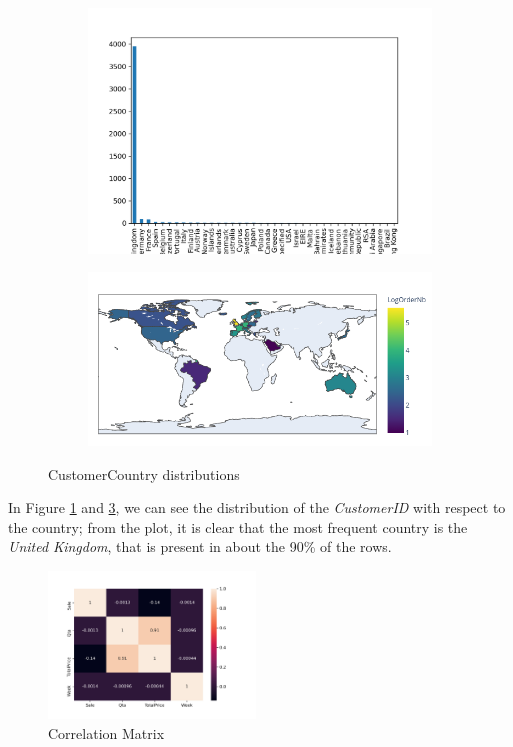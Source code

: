 \begin{figure}[!h]
\begin{subfigure}{.5\textwidth}
\centering
\includegraphics[width=.93\textwidth]{img/orders_country_bar.png}
\caption{}
\label{fig:orders_country_bar}
\end{subfigure}
\begin{subfigure}{.5\textwidth}
\centering
\includegraphics[width=.93\textwidth]{img/orders_country.png}
\caption{}
\label{fig:orders_country}
\end{subfigure}
\caption{CustomerCountry distributions}
\end{figure}

In Figure \ref{fig:orders_country_bar} and \ref{fig:orders_country}, we can see the distribution of the \emph{CustomerID} with respect to the country; from the plot, it is clear that the most frequent country is the \emph{United Kingdom}, that is present in about the 90\% of the rows.

\begin{figure}
\centering
\includegraphics[width=0.49\textwidth]{img/corr.png}
\caption{Correlation Matrix}
\label{fig:corr}
\end{figure}

